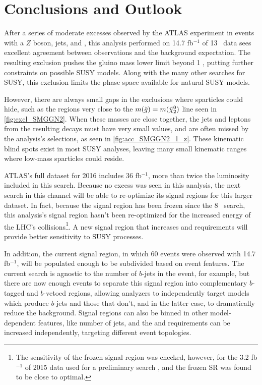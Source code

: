 
\chapter{Conclusions and Outlook} %
\label{ch:conc} 

After a series of moderate excesses observed by the \ac{ATLAS} experiment in events with a $Z$ boson, jets, and \met, this analysis performed on 14.7 fb$^{-1}$ of 13 \tev~data sees excellent agreement between observations and the background expectation. The resulting exclusion pushes the gluino mass lower limit beyond 1 \tev, putting further constraints on possible \ac{SUSY} models. Along with the many other searches for \ac{SUSY}, this exclusion limits the phase space available for natural \ac{SUSY} models. %

However, there are always small gaps in the exclusions where sparticles could hide, such as the regions very close to the $m({{\tilde g}}) = m(\tilde{\chi}^{0}_{2})$ line seen in \autoref{fig:excl_SMGGN2}. When these masses are close together, the jets and leptons from the resulting decays must have very small \pt values, and are often missed by the analysis's selections, as seen in \autoref{fig:acc_SMGGN2_1_z}. These kinematic blind spots exist in most \ac{SUSY} analyses, leaving many small kinematic ranges where low-mass sparticles could reside.

\ac{ATLAS}'s full dataset for 2016 includes 36 fb$^{-1}$, more than twice the luminosity included in this search. Because no excess was seen in this analysis, the next search in this channel will be able to re-optimize its signal regions for this larger dataset. In fact, because the signal region has been frozen since the 8 \tev~search, this analysis's signal region hasn't been re-optimized for the increased energy of the \ac{LHC}'s collisions\footnote{The sensitivity of the frozen signal region was checked, however, for the 3.2 fb$^{-1}$ of 2015 data used for a preliminary search \cite{ATLAS-CONF-2015-082}, and the frozen \ac{SR} was found to be close to optimal.}. A new signal region that increases \met and \HT requirements will provide better sensitivity to \ac{SUSY} processes. 

In addition, the current signal region, in which 60 events were observed with 14.7 fb$^{-1}$, will be populated enough to be subdivided based on event features. The current search is agnostic to the number of $b$-jets in the event, for example, but there are now enough events to separate this signal region into complementary $b$-tagged and $b$-vetoed regions, allowing analyzers to independently target models which produce $b$-jets and those that don't, and in the latter case, to dramatically reduce the \ttbar background. Signal regions can also be binned in other model-dependent features, like number of jets, and the \met and \HT requirements can be increased independently, targeting different event topologies. 

